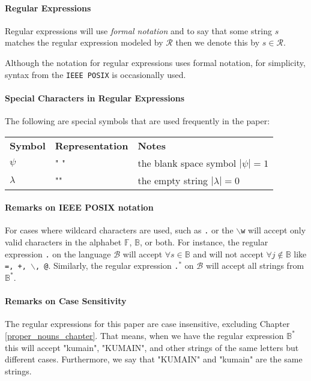 \paragraph{Regular Expressions}
Regular expressions will use \emph{formal notation} and to say that some string \(s\) matches the regular expression modeled by \(\mathcal{R}\) then we denote this by \(s \in \mathcal{R}\).

Although the notation for regular expressions uses formal notation, for simplicity, syntax from the \texttt{IEEE POSIX} is occasionally used.

\paragraph{Special Characters in Regular Expressions} The following are special symbols that are used frequently in the paper:

\begin{center}
    \begin{tabular}{l l l}
        \textbf{Symbol} & \textbf{Representation} & \textbf{Notes}                    \\
        $\psi$          & " "                     & the blank space symbol $|\psi|=1$ \\
        $\lambda$       & ""                      & the empty string $|\lambda| = 0$
    \end{tabular}
\end{center}

\paragraph{Remarks on IEEE POSIX notation} For cases where wildcard characters are used, such as \texttt{.} or the $\backslash$\texttt{w} will accept only valid characters in the alphabet $\mathbb{F}$, $\mathbb{B}$, or both. For instance, the regular expression \texttt{.} on the language $\mathcal{B}$ will accept $\forall s\in \mathbb{B}$ and will not accept $\forall j\notin \mathbb{B}$ like \texttt{=, +, $\backslash$, @}. Similarly, the regular expression \texttt{.$^*$} on $\mathcal{B}$ will accept all strings from $\mathbb{B}^*$.

\paragraph{Remarks on Case Sensitivity} The regular expressions for this paper are case insensitive, excluding Chapter \ref{proper_nouns_chapter}. That means, when we have the regular expression $\mathbb{B}^*$ this will accept "kumain", "KUMAIN", and other strings of the same letters but different cases. Furthermore, we say that "KUMAIN" and "kumain" are the same strings.

